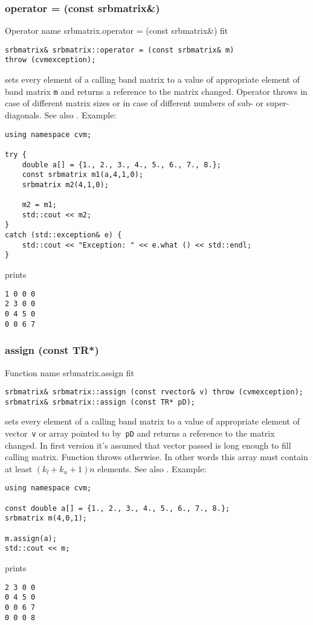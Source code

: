 \subsubsection{operator = (const srbmatrix\&)}
Operator%
\pdfdest name {srbmatrix.operator = (const srbmatrix&)} fit
\begin{verbatim}
srbmatrix& srbmatrix::operator = (const srbmatrix& m)
throw (cvmexception);
\end{verbatim}
sets every element of a calling band matrix to a value of
appropriate element of  band matrix \verb"m"
and returns a reference to
the matrix changed.
Operator throws  
in case of different matrix sizes or in case of different numbers
of sub- or super-diagonals.
See also .
Example:
\begin{Verbatim}
using namespace cvm;

try {
    double a[] = {1., 2., 3., 4., 5., 6., 7., 8.};
    const srbmatrix m1(a,4,1,0);
    srbmatrix m2(4,1,0);

    m2 = m1;
    std::cout << m2;
}
catch (std::exception& e) {
    std::cout << "Exception: " << e.what () << std::endl;
}
\end{Verbatim}
prints
\begin{Verbatim}
1 0 0 0
2 3 0 0
0 4 5 0
0 0 6 7
\end{Verbatim}
\newpage



\subsubsection{assign (const TR*)}
Function%
\pdfdest name {srbmatrix.assign} fit
\begin{verbatim}
srbmatrix& srbmatrix::assign (const rvector& v) throw (cvmexception);
srbmatrix& srbmatrix::assign (const TR* pD);
\end{verbatim}
sets every element of a calling band matrix to a value of
appropriate element of  vector~\verb'v'
or  array pointed to by~\verb"pD"
and returns a reference to
the matrix changed.
In first version it's assumed that vector passed is long
enough to fill calling matrix. Function throws  
otherwise.
In other words this array must contain at least $(k_l + k_u + 1)n$ elements.
See also .
Example:
\begin{Verbatim}
using namespace cvm;

const double a[] = {1., 2., 3., 4., 5., 6., 7., 8.};
srbmatrix m(4,0,1);

m.assign(a);
std::cout << m;
\end{Verbatim}
prints
\begin{Verbatim}
2 3 0 0
0 4 5 0
0 0 6 7
0 0 0 8
\end{Verbatim}
\newpage


